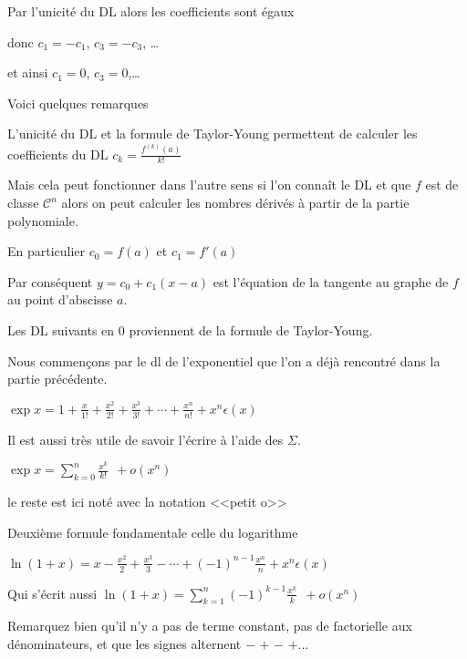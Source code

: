 Par l'unicité du DL alors les coefficients sont égaux

donc $c_1=-c_1$, $c_3=-c_3$, \ldots \ 

\change

et ainsi $c_1=0$, $c_3=0$,\ldots

\change

Voici quelques remarques 

L'unicité du DL et la formule de Taylor-Young 
permettent de calculer les coefficients du DL
$c_k = \frac{f^{(k)}(a)}{k!}$

Mais cela peut fonctionner dans l'autre sens 
si l'on connaît le DL et que $f$ est de classe $\mathcal{C}^n$
alors on peut calculer les nombres dérivés à partir de la partie polynomiale.

\change

En particulier $c_0=f(a)$ et $c_1=f'(a)$

\change

Par conséquent $y=c_0+c_1(x-a)$ est l'équation de la tangente au graphe de $f$
au point d'abscisse $a$.


\diapo

Les DL suivants en $0$ proviennent de la formule de Taylor-Young.

Nous commençons par le dl de l'exponentiel 
que l'on a déjà rencontré dans la partie précédente.

$\exp x=1+\frac{x}{1!}+\frac{x^2}{2!}+\frac{x^3}{3!}+\cdots+\frac{x^n}{n!}
+x^n\epsilon(x)$

\change

Il est aussi très utile de savoir l'écrire à l'aide des $\Sigma$.

$\exp x=\sum_ {k=0}^n \frac{x^k}{k!} \ \ + o(x^n)$

le reste est ici noté avec la notation <<petit o>>

\change

Deuxième formule fondamentale celle du logarithme

$\ln(1+x)=x-\frac{x^2}{2}+\frac{x^3}{3}-\cdots
+(-1)^{n-1}\frac{x^{n}}{n} +x^{n}\epsilon(x)$

\change

Qui s'écrit aussi 
$\ln(1+x)=\sum_ {k=1}^n (-1)^{k-1}\frac{x^k}{k}\ \  + o(x^n)$

Remarquez bien qu'il n'y a pas de terme constant, pas de factorielle aux dénominateurs, 
et que les signes alternent  $-$ $+$ $-$ $+$...

\change


